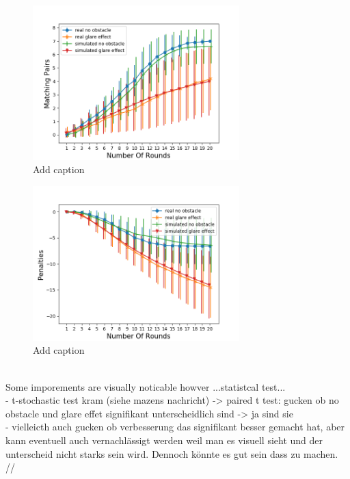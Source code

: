 \begin{minipage}{0.5\textwidth}
	\begin{figure}[H]
		\centering
		\includegraphics[width=8cm]{images/simulationOptimized1.png}
		\caption[Bild kurz]{Add caption}
		\label{fig:simOp1}
	\end{figure}
\end{minipage}
\begin{minipage}{0.5\textwidth}
	\begin{figure}[H]
		\centering
		\includegraphics[width=8cm]{images/simulationOptimized2.png}
		\caption[Bild kurz]{Add caption}
		\label{fig:simOp2}
	\end{figure}
\end{minipage} 



\\
Some imporements are visually noticable howver ...statistcal test...\\
- t-stochastic test kram (siehe mazens nachricht) -> paired t test: gucken ob no obstacle und glare effet signifikant unterscheidlich sind -> ja sind sie \\
- vielleicth auch gucken ob verbesserung das signifikant besser gemacht hat, aber kann eventuell auch vernachlässigt werden weil man es visuell sieht und der unterscheid nicht starks sein wird. Dennoch könnte es gut sein dass zu machen. //

